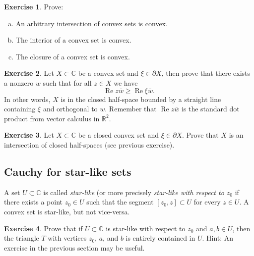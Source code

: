 \documentclass[12pt,openany]{book}
\renewcommand{\Re}{\operatorname{Re}}
\newcommand{\C}{{\mathbb{C}}}
\newcommand{\R}{{\mathbb{R}}}
\newcommand{\myindex}[1]{#1\index{#1}}
\theoremstyle{plain}
\theoremstyle{remark}
\theoremstyle{definition}
\newenvironment{exbox}{%
    \def\FrameCommand{\vrule width 1pt \relax\hspace {10pt}}%
    \MakeFramed {\advance \hsize -\width \FrameRestore }%
}{%
    \endMakeFramed
}
\newenvironment{exparts}{%
    \leavevmode\begin{enumerate}[a),noitemsep,topsep=0pt,parsep=0pt,partopsep=0pt]
}{%
    \end{enumerate}
}
\theoremstyle{exercise}
\newtheorem{exercise}{Exercise}[section]
\theoremstyle{example}
\begin{document}
\begin{exbox}
\begin{exercise}
Prove:
\begin{exparts}
\item
An arbitrary intersection of convex sets is convex.
\item
The interior of a convex set is convex.
\item
The closure of a convex set is convex.
\end{exparts}
\end{exercise}

\begin{exercise}
Let $X \subset \C$ be a convex set and $\xi \in \partial X$, then prove that
there exists a nonzero $w$ such that for all $z \in X$ we have
\begin{equation*}
\Re z\bar{w} \geq \Re \xi\bar{w} .
\end{equation*}
In other words, $X$ is in the closed half-space
bounded by a straight line containing $\xi$ and
orthogonal to $w$.
Remember that $\Re z\bar{w}$ is the standard dot product from
vector calculus in $\R^2$.
\end{exercise}

\begin{exercise}
Let $X \subset \C$ be a closed convex set and $\xi \in \partial X$.
Prove that $X$ is an intersection of closed half-spaces (see previous
exercise).
\end{exercise}
\end{exbox}

\subsection{Cauchy for star-like sets}

A set $U \subset \C$ is called \emph{\myindex{star-like}} (or more precisely
\emph{star-like with respect to $z_0$} if there exists a
point $z_0 \in U$ such that the segment $[z_0,z] \subset U$ for every
$z \in U$.  A convex set is star-like, but not vice-versa.

\begin{exbox}
\begin{exercise}
Prove that if $U \subset \C$ is star-like with respect to $z_0$ and $a,b \in
U$, then the triangle $T$ with vertices $z_0$, $a$, and $b$ is entirely
contained in $U$.  Hint: An exercise in the previous section may be useful.
\end{exercise}
\end{exbox}
\end{document}
